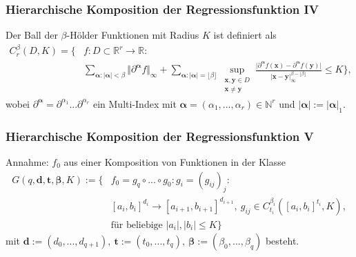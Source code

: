 \documentclass[hyperref={pdfpagelabels=false}]{beamer}
\begin{document}
\begin{frame}
\frametitle{Hierarchische Komposition der Regressionsfunktion \RN{4}}
Der Ball der $\beta$-Hölder Funktionen mit Radius $K$ ist definiert als 
\begin{align*}
C_r ^\beta (D,K) = \biggl\{ &f:  D \subset \mathbb{R}^r \rightarrow \mathbb{R} :  \\ 
&\sum _{\boldsymbol{\alpha}: \vert \boldsymbol{\alpha} \vert < \beta} \Vert \partial ^{\boldsymbol{\alpha}} f \Vert _\infty + \sum_{\boldsymbol{\alpha} : \vert \boldsymbol{\alpha} \vert = \lfloor \beta \rfloor} \sup_{\substack{\mathbf{x}, \mathbf{y} \in D \\ \mathbf{x}\neq \mathbf{y}}} \frac{\vert \partial ^{\boldsymbol{\alpha}} f(\mathbf{x}) - \partial ^{\boldsymbol{\alpha}} f(\mathbf{y}) \vert}{\vert \mathbf{x}-\mathbf{y} \vert _{\infty}^{\beta - \lfloor \beta \rfloor}} \leq K \biggr\},
\end{align*}
wobei $\partial ^{\boldsymbol{\alpha}} = \partial ^{\alpha _1}...\partial ^{\alpha _r}$ ein Multi-Index mit $\boldsymbol{\alpha} = ( \alpha _1, ..., \alpha _r) \in \mathbb{N}^r$  und $\vert \boldsymbol{\alpha} \vert := \vert \boldsymbol{\alpha} \vert _1$.
\end{frame}

\begin{frame}
\frametitle{Hierarchische Komposition der Regressionsfunktion \RN{5}}
Annahme: $f_0$ aus einer Komposition von Funktionen in der Klasse 
\begin{align*}
G (q,\mathbf{d}, \mathbf{t}, \boldsymbol{\beta}, K) := \{ & f_0 = g_q \circ ... \circ g_0: g_i = (g_{ij})_j: \\ & [a_i,b_i]^{d_i} \rightarrow [a_{i+1}, b_{i+1}]^{d_{i+1}}, \
g_{ij} \in C_{t_i} ^{\beta _i}([a_i,b_i]^{t_i},K), \\ &\text{für beliebige } \vert a_i \vert ,\vert b_i \vert \leq K \}
\end{align*}
mit $\mathbf{d} := (d_0, ..., d_{q+1}), \ \mathbf{t} := (t_0, ..., t_q), \ 	\boldsymbol{\beta} := (\beta _0,..., \beta _q)$ besteht.
\end{frame}
\end{document}
